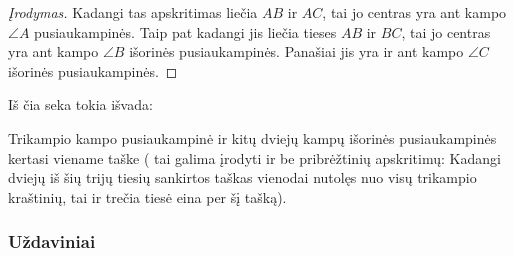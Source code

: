 \begin{proof}[Įrodymas]
  Kadangi tas apskritimas liečia $AB$ ir $AC$, tai jo centras
  yra ant kampo $\angle A$ pusiaukampinės. Taip pat kadangi
  jis liečia tieses $AB$ ir $BC$, tai jo centras yra ant kampo
  $\angle B$ išorinės pusiaukampinės. Panašiai jis yra ir ant
  kampo $\angle C$ išorinės pusiaukampinės.  
\end{proof}

Iš čia seka tokia išvada:

\begin{teig}
  Trikampio kampo pusiaukampinė ir kitų dviejų kampų išorinės
  pusiaukampinės kertasi viename taške ( tai galima įrodyti ir
  be pribrėžtinių apskritimų: Kadangi dviejų iš šių trijų
  tiesių sankirtos taškas vienodai nutolęs nuo visų trikampio
  kraštinių, tai ir trečia tiesė eina per šį tašką).
\end{teig}

\subsubsection{Uždaviniai}

